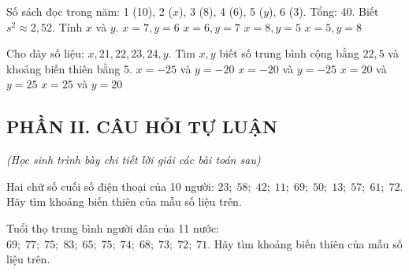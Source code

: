 \begin{ex}
	Số sách đọc trong năm: 1 (10), 2 ($x$), 3 (8), 4 (6), 5 ($y$), 6 (3). Tổng: 40. Biết $s^2 \approx 2{,}52$. Tính $x$ và $y$.
	\choice
	{\True $x = 7, y = 6$}
	{$x = 6, y = 7$}
	{$x = 8, y = 5$}
	{$x = 5, y = 8$}
\end{ex}

\begin{ex}
	Cho dãy số liệu: $x, 21, 22, 23, 24, y$. Tìm $x, y$ biết số trung bình cộng bằng $22{,}5$ và khoảng biến thiên bằng 5.
	\choice
	{$x = -25$ và $y = -20$}
	{$x = -20$ và $y = -25$}
	{\True $x = 20$ và $y = 25$}
	{$x = 25$ và $y = 20$}
\end{ex}

\vspace{0.4cm}
\subsection*{PHẦN II. CÂU HỎI TỰ LUẬN}
\textit{\small (Học sinh trình bày chi tiết lời giải các bài toán sau)}


\begin{bt}
	Hai chữ số cuối số điện thoại của 10 người: $23;\; 58;\; 42;\; 11;\; 69;\; 50;\; 13;\; 57;\; 61;\; 72$. Hãy tìm khoảng biến thiên của mẫu số liệu trên.
\end{bt}

\begin{bt}
	Tuổi thọ trung bình người dân của 11 nước: $69;\; 77;\; 75;\; 83;\; 65;\; 75;\; 74;\; 68;\; 73;\; 72;\; 71$. Hãy tìm khoảng biến thiên của mẫu số liệu trên.
\end{bt}

